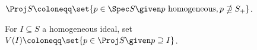 $\Proj S\coloneqq \set{p \in \Spec S\given p\text{ homogeneous}, p\nsupseteq S_+}$.

For $I \subseteq S$ a homogeneous ideal, set $V(I)\coloneqq \set{p \in \Proj S\given p\supseteq I}$.
